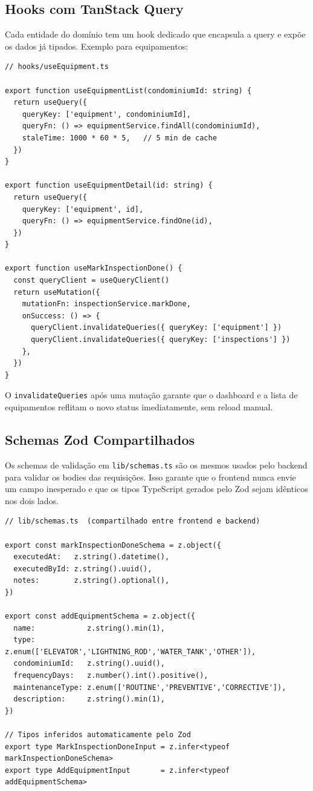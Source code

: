 \documentclass[12pt, a4paper]{article}
\begin{document}
\subsection{Hooks com TanStack Query}

Cada entidade do domínio tem um hook dedicado que encapsula a query e
expõe os dados já tipados. Exemplo para equipamentos:

\begin{verbatim}
// hooks/useEquipment.ts

export function useEquipmentList(condominiumId: string) {
  return useQuery({
    queryKey: ['equipment', condominiumId],
    queryFn: () => equipmentService.findAll(condominiumId),
    staleTime: 1000 * 60 * 5,   // 5 min de cache
  })
}

export function useEquipmentDetail(id: string) {
  return useQuery({
    queryKey: ['equipment', id],
    queryFn: () => equipmentService.findOne(id),
  })
}

export function useMarkInspectionDone() {
  const queryClient = useQueryClient()
  return useMutation({
    mutationFn: inspectionService.markDone,
    onSuccess: () => {
      queryClient.invalidateQueries({ queryKey: ['equipment'] })
      queryClient.invalidateQueries({ queryKey: ['inspections'] })
    },
  })
}
\end{verbatim}

O \texttt{invalidateQueries} após uma mutação garante que o dashboard e a
lista de equipamentos reflitam o novo status imediatamente, sem reload manual.

\subsection{Schemas Zod Compartilhados}

Os schemas de validação em \texttt{lib/schemas.ts} são os mesmos usados
pelo backend para validar os bodies das requisições. Isso garante que o
frontend nunca envie um campo inesperado e que os tipos TypeScript gerados
pelo Zod sejam idênticos nos dois lados.

\begin{verbatim}
// lib/schemas.ts  (compartilhado entre frontend e backend)

export const markInspectionDoneSchema = z.object({
  executedAt:   z.string().datetime(),
  executedById: z.string().uuid(),
  notes:        z.string().optional(),
})

export const addEquipmentSchema = z.object({
  name:            z.string().min(1),
  type:            z.enum(['ELEVATOR','LIGHTNING_ROD','WATER_TANK','OTHER']),
  condominiumId:   z.string().uuid(),
  frequencyDays:   z.number().int().positive(),
  maintenanceType: z.enum(['ROUTINE','PREVENTIVE','CORRECTIVE']),
  description:     z.string().min(1),
})

// Tipos inferidos automaticamente pelo Zod
export type MarkInspectionDoneInput = z.infer<typeof markInspectionDoneSchema>
export type AddEquipmentInput       = z.infer<typeof addEquipmentSchema>
\end{verbatim}
\end{document}
